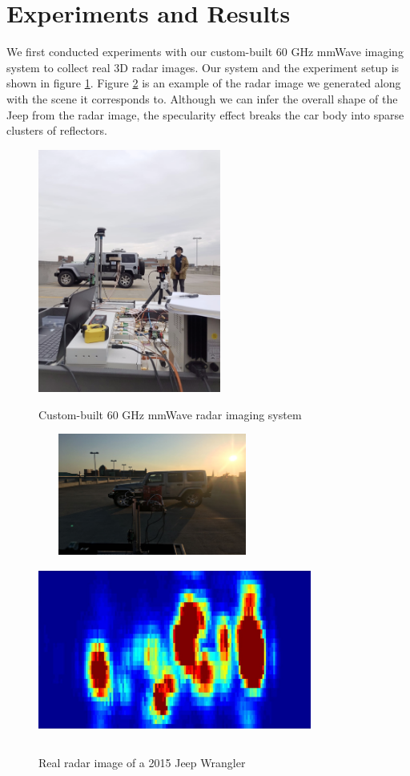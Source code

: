 \section{ Experiments and Results} \label{experiment}
We first conducted experiments with our custom-built 60 GHz mmWave imaging system to collect real 3D radar images. Our system and the experiment setup is shown in figure \ref{fig_exp}. Figure \ref{fig_real} is an example of the radar image we generated along with the scene it corresponds to. Although we can infer the overall shape of the Jeep from the radar image, the specularity effect breaks the car body into sparse clusters of reflectors.

\begin{figure}
	\centering
	\includegraphics[width=6cm,height=8cm]{./figure/exp_2.png}\\
	\caption{Custom-built 60 GHz mmWave radar imaging system}
	\label{fig_exp}
\end{figure}
 
\begin{figure}
	\centering
	\includegraphics[width=7.5cm,height=4cm]{./figure/exp_1.png}\\
	\includegraphics[width=9cm,height=6cm]{./figure/exp_1_img.jpg}
	\caption{Real radar image of a 2015 Jeep Wrangler}
	\label{fig_real}
\end{figure} 

